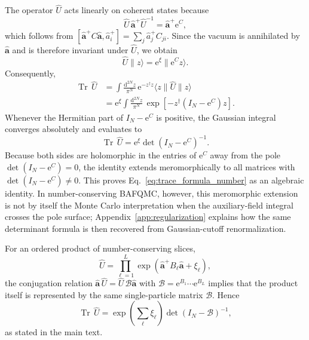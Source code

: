 \documentclass[twocolumn,aps,prb,10pt,amsmath,amssymb,amsthm,superscriptaddress]{revtex4-2}
\newcommand{\Tr}{\operatorname{Tr}}
\newcommand{\dd}{\mathrm{d}}
\newcommand{\ee}{\mathrm{e}}
\newcommand{\hc}{\dagger}
\newcommand{\mc}[1]{\mathcal{#1}}
\newcommand{\bb}[1]{\bm{#1}}
\theoremstyle{remark}
\begin{document}
The operator $\hat U$ acts linearly on coherent states because
\begin{equation}
    \hat U\,\hat{\bb a}^+\hat U^{-1} = \hat{\bb a}^+\ee^C,
\end{equation}
which follows from $[\hat{\bb a}^+C\hat{\bb a},\hat a_i^+]=\sum_j \hat a_j^+ C_{ji}$. Since the vacuum is annihilated by $\hat{\bb a}$ and is therefore invariant under $\hat U$, we obtain
\begin{equation}
    \hat U\|z\rangle = \ee^{\xi}\|\ee^C z\rangle.
\end{equation}
Consequently,
\begin{equation}
\begin{aligned}
    \Tr\,\hat U
    &= \int \frac{\dd^{2N}z}{\pi^N}\,\ee^{-z^\hc z}\langle z\|\hat U\|z\rangle \\
    &= \ee^{\xi}\int \frac{\dd^{2N}z}{\pi^N}\,\exp\left[-z^\hc(I_N-\ee^C)z\right].
\end{aligned}
\end{equation}
Whenever the Hermitian part of $I_N-\ee^C$ is positive, the Gaussian integral converges absolutely and evaluates to
\begin{equation}
    \Tr\,\hat U = \ee^{\xi}\det(I_N-\ee^C)^{-1}.
    \label{eq:number_trace_appendix}
\end{equation}
Because both sides are holomorphic in the entries of $\ee^C$ away from the pole $\det(I_N-\ee^C)=0$, the identity extends meromorphically to all matrices with $\det(I_N-\ee^C)\neq 0$. This proves Eq.~\eqref{eq:trace_formula_number} as an algebraic identity. In number-conserving BAFQMC, however, this meromorphic extension is not by itself the Monte Carlo interpretation when the auxiliary-field integral crosses the pole surface; Appendix~\ref{app:regularization} explains how the same determinant formula is then recovered from Gaussian-cutoff renormalization.

For an ordered product of number-conserving slices,
\begin{equation}
    \hat U = \prod_{\ell=1}^{L}\exp\left(\hat{\bb a}^+B_\ell\hat{\bb a}+\xi_\ell\right),
\end{equation}
the conjugation relation $\hat{\bb a}\,\hat U = \hat U\,\mc B\hat{\bb a}$ with $\mc B=\ee^{B_1}\cdots\ee^{B_L}$ implies that the product itself is represented by the same single-particle matrix $\mc B$. Hence
\begin{equation}
    \Tr\,\hat U = \exp\!\left(\sum_{\ell}\xi_\ell\right)\det(I_N-\mc B)^{-1},
\end{equation}
as stated in the main text.
\end{document}
